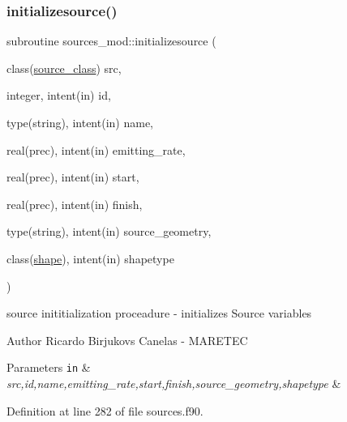\subsubsection{\texorpdfstring{initializesource()}{initializesource()}}
{\footnotesize\ttfamily subroutine sources\+\_\+mod\+::initializesource (\begin{DoxyParamCaption}\item[{class(\mbox{\hyperlink{structsources__mod_1_1source__class}{source\+\_\+class}})}]{src,  }\item[{integer, intent(in)}]{id,  }\item[{type(string), intent(in)}]{name,  }\item[{real(prec), intent(in)}]{emitting\+\_\+rate,  }\item[{real(prec), intent(in)}]{start,  }\item[{real(prec), intent(in)}]{finish,  }\item[{type(string), intent(in)}]{source\+\_\+geometry,  }\item[{class(\mbox{\hyperlink{structgeometry__mod_1_1shape}{shape}}), intent(in)}]{shapetype }\end{DoxyParamCaption})\hspace{0.3cm}{\ttfamily [private]}}



source inititialization proceadure -\/ initializes Source variables 

\begin{DoxyAuthor}{Author}
Ricardo Birjukovs Canelas -\/ M\+A\+R\+E\+T\+EC 
\end{DoxyAuthor}

\begin{DoxyParams}[1]{Parameters}
\mbox{\tt in}  & {\em src,id,name,emitting\+\_\+rate,start,finish,source\+\_\+geometry,shapetype} & \\
\hline
\end{DoxyParams}


Definition at line 282 of file sources.\+f90.


